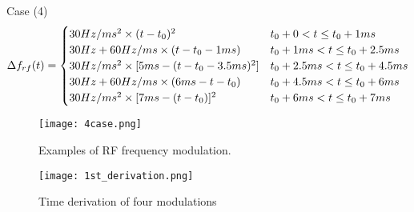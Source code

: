 Case (4) 
\begin{eqnarray}\Delta f_{rf}(t)=
\begin{cases}
30Hz/ms^2 \times (t-t_0)^2 &t_0+0<t\le t_0+1ms\cr  
30Hz + 60Hz/ms\times (t-t_0 -1ms) &t_0+1ms<t\le t_0+2.5ms\cr 
30Hz/ms^2 \times [5ms-(t-t_0-3.5ms)^2] &t_0+2.5ms<t\le t_0+4.5ms\cr  
30Hz + 60Hz/ms\times (6ms-t-t_0) &t_0+4.5ms<t\le t_0+6ms\cr  
30Hz/ms^2 \times [7ms-(t-t_0)]^2 &t_0+6ms<t\le t_0+7ms\cr  
\end{cases}
\end{eqnarray}

\begin{figure}[!htb]
   \centering   
   \texttt{[image: 4case.png]}
   \caption{Examples of RF frequency modulation.}
   \label{4case}
\end{figure}

\begin{figure}[!htb]
   \centering   
   \texttt{[image: 1st\_derivation.png]}
   \caption{Time derivation of four modulations}
   \label{1st_derivation}
\end{figure}

